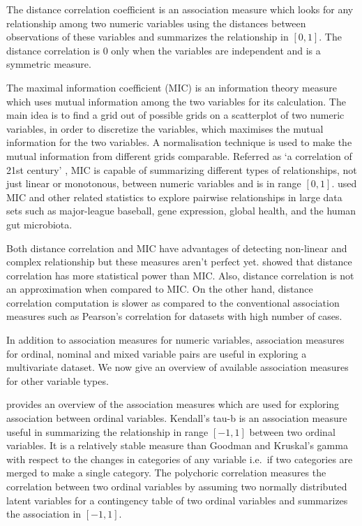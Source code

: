 The distance correlation coefficient \citep{szekely2007measuring} is an
association measure which looks for any relationship among two numeric
variables using the distances between observations of these variables
and summarizes the relationship in \([0,1]\). The distance correlation
is \(0\) only when the variables are independent and is a symmetric
measure.

The maximal information coefficient (MIC) \citep{reshef2011detecting} is
an information theory measure which uses mutual information among the
two variables for its calculation. The main idea is to find a grid out
of possible grids on a scatterplot of two numeric variables, in order to
discretize the variables, which maximises the mutual information for the
two variables. A normalisation technique is used to make the mutual
information from different grids comparable. Referred as `a correlation
of 21st century' \citep{speed2011correlation}, MIC is capable of
summarizing different types of relationships, not just linear or
monotonous, between numeric variables and is in range \([0,1]\).
\citet{reshef2011detecting} used MIC and other related statistics to
explore pairwise relationships in large data sets such as major-league
baseball, gene expression, global health, and the human gut microbiota.

Both distance correlation and MIC have advantages of detecting
non-linear and complex relationship but these measures aren't perfect
yet. \citet{commentSimonTibshirani} showed that distance correlation has
more statistical power than MIC. Also, distance correlation is not an
approximation when compared to MIC. On the other hand, distance
correlation computation is slower as compared to the conventional
association measures such as Pearson's correlation for datasets with
high number of cases.

In addition to association measures for numeric variables, association
measures for ordinal, nominal and mixed variable pairs are useful in
exploring a multivariate dataset. We now give an overview of available
association measures for other variable types.

\citet{agresti2010analysis} provides an overview of the association
measures which are used for exploring association between ordinal
variables. Kendall's tau-b \citep{kendall1945treatment} is an
association measure useful in summarizing the relationship in range
\([-1,1]\) between two ordinal variables. It is a relatively stable
measure than Goodman and Kruskal's gamma with respect to the changes in
categories of any variable i.e.~if two categories are merged to make a
single category. The polychoric correlation \citep{olsson1979maximum}
measures the correlation between two ordinal variables by assuming two
normally distributed latent variables for a contingency table of two
ordinal variables and summarizes the association in \([-1,1]\).


